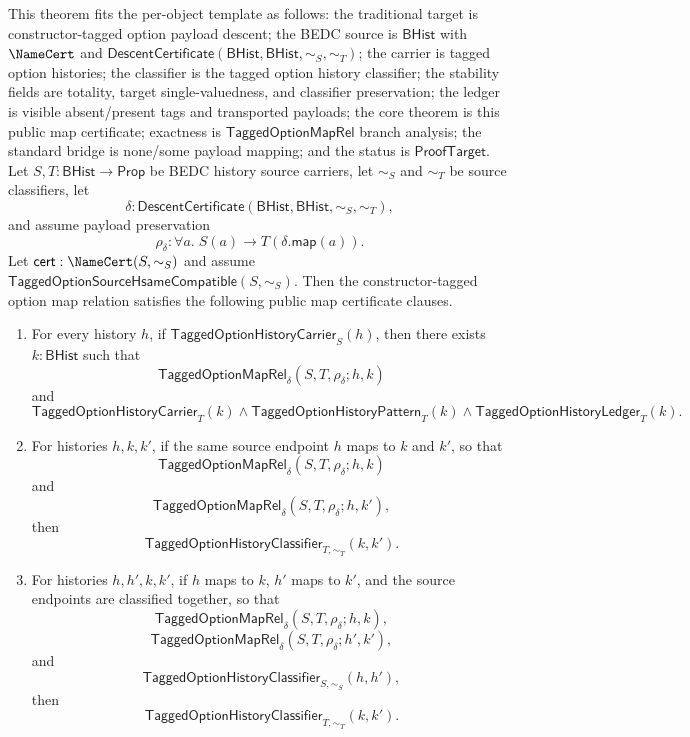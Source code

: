 \begin{theorem}
\label{thm:tagged-option-payload-descent-public-map-certificate}
This theorem fits the per-object template as follows: the traditional target is
constructor-tagged option payload descent; the BEDC source is $\mathsf{BHist}$
with $\NameCert$ and
$\mathsf{DescentCertificate}(\mathsf{BHist},\mathsf{BHist},\sim_S,\sim_T)$;
the carrier is tagged option histories; the classifier is the tagged option
history classifier; the stability fields are totality, target single-valuedness,
and classifier preservation; the ledger is visible absent/present tags and
transported payloads; the core theorem is this public map certificate; exactness
is $\mathsf{TaggedOptionMapRel}$ branch analysis; the standard bridge is
none/some payload mapping; and the status is $\mathsf{ProofTarget}$. Let
$S,T:\mathsf{BHist}\to\mathsf{Prop}$ be BEDC history source carriers, let
$\sim_S$ and $\sim_T$ be source classifiers, let
$$
\delta:\mathsf{DescentCertificate}(\mathsf{BHist},\mathsf{BHist},\sim_S,\sim_T),
$$
and assume payload preservation
$$
\rho_{\delta}:\forall a.\;S(a)\to T(\delta.\mathsf{map}(a)).
$$
Let $\mathsf{cert}:\NameCert(S,\sim_S)$ and assume
$\mathsf{TaggedOptionSourceHsameCompatible}(S,\sim_S)$. Then the
constructor-tagged option map relation satisfies the following public map
certificate clauses.
\begin{enumerate}
  \item For every history $h$, if
  $\mathsf{TaggedOptionHistoryCarrier}_S(h)$, then there exists $k:\mathsf{BHist}$
  such that
  $$
  \mathsf{TaggedOptionMapRel}_{\delta}(S,T,\rho_{\delta};h,k)
  $$
  and
  $$
  \mathsf{TaggedOptionHistoryCarrier}_T(k)\land
  \mathsf{TaggedOptionHistoryPattern}_T(k)\land
  \mathsf{TaggedOptionHistoryLedger}_T(k).
  $$
  \item For histories $h,k,k'$, if the same source endpoint $h$ maps to $k$ and
  $k'$, so that
  $$
  \mathsf{TaggedOptionMapRel}_{\delta}(S,T,\rho_{\delta};h,k)
  $$
  and
  $$
  \mathsf{TaggedOptionMapRel}_{\delta}(S,T,\rho_{\delta};h,k'),
  $$
  then
  $$
  \mathsf{TaggedOptionHistoryClassifier}_{T,\sim_T}(k,k').
  $$
  \item For histories $h,h',k,k'$, if $h$ maps to $k$, $h'$ maps to $k'$, and
  the source endpoints are classified together, so that
  $$
  \mathsf{TaggedOptionMapRel}_{\delta}(S,T,\rho_{\delta};h,k),
  $$
  $$
  \mathsf{TaggedOptionMapRel}_{\delta}(S,T,\rho_{\delta};h',k'),
  $$
  and
  $$
  \mathsf{TaggedOptionHistoryClassifier}_{S,\sim_S}(h,h'),
  $$
  then
  $$
  \mathsf{TaggedOptionHistoryClassifier}_{T,\sim_T}(k,k').
  $$
\end{enumerate}
\end{theorem}
